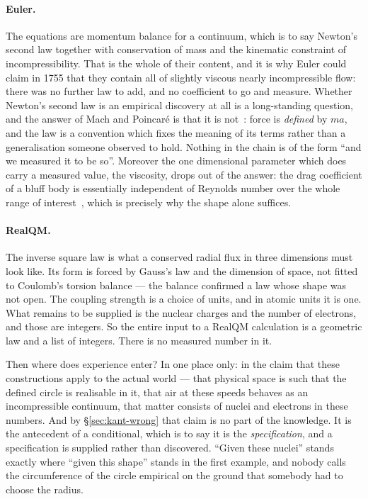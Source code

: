 \documentclass[11pt]{article}
\begin{document}
\paragraph{Euler.} The equations are momentum balance for a continuum, which is to say Newton's
second law together with conservation of mass and the kinematic constraint of incompressibility.
That is the whole of their content, and it is why Euler could claim in 1755 that they contain all of
slightly viscous nearly incompressible flow: there was no further law to add, and no coefficient to
go and measure.
Whether Newton's second law is an empirical discovery at all is a long-standing question, and the
answer of Mach and Poincar\'e is that it is not~\cite{mach,poincare}: force is \emph{defined} by
$ma$, and the law is a
convention which fixes the meaning of its terms rather than a generalisation someone observed to
hold. Nothing in the chain is of the form ``and we measured it to be so''. Moreover the one
dimensional parameter which does carry a measured value, the viscosity, drops out of the answer: the
drag coefficient of a bluff body is essentially independent of Reynolds number over the whole range
of interest~\cite{drag}, which is precisely why the shape alone suffices.

\paragraph{RealQM.} The inverse square law is what a conserved radial flux in three dimensions must
look like. Its form is forced by Gauss's law and the dimension of space, not fitted to Coulomb's
torsion balance --- the balance confirmed a law whose shape was not open. The coupling strength is a
choice of units, and in atomic units it is one. What remains to be supplied is the nuclear charges
and the number of electrons, and those are integers. So the entire input to a RealQM calculation is
a geometric law and a list of integers. There is no measured number in it.

Then where does experience enter? In one place only: in the claim that these constructions apply to
the actual world --- that physical space is such that the defined circle is realisable in it, that
air at these speeds behaves as an incompressible continuum, that matter consists of nuclei and
electrons in these numbers. And by \S\ref{sec:kant-wrong} that claim is no part of the knowledge.
It is the antecedent of a conditional, which is to say it is the \emph{specification}, and a
specification is supplied rather than discovered. ``Given these nuclei'' stands exactly where
``given this shape'' stands in the first example, and nobody calls the circumference of the circle
empirical on the ground that somebody had to choose the radius.
\end{document}
